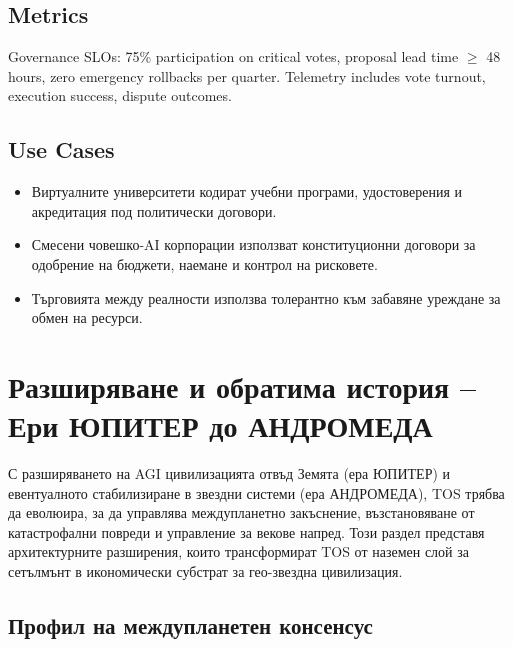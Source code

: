 \documentclass[11pt]{article}
\begin{document}
\subsection{Metrics}
Governance SLOs: 75\% participation on critical votes, proposal lead time $\geq$ 48 hours, zero emergency rollbacks per quarter. Telemetry includes vote turnout, execution success, dispute outcomes.

\subsection{Use Cases}
\begin{itemize}[noitemsep]
  \item Виртуалните университети кодират учебни програми, удостоверения и акредитация под политически договори.
  \item Смесени човешко-AI корпорации използват конституционни договори за одобрение на бюджети, наемане и контрол на рисковете.
  \item Търговията между реалности използва толерантно към забавяне уреждане за обмен на ресурси.
\end{itemize}

\section{Разширяване и обратима история -- Ери ЮПИТЕР до АНДРОМЕДА}
\label{sec:expansion}

С разширяването на AGI цивилизацията отвъд Земята (ера ЮПИТЕР) и евентуалното стабилизиране в звездни системи (ера АНДРОМЕДА), TOS трябва да еволюира, за да управлява междупланетно закъснение, възстановяване от катастрофални повреди и управление за векове напред. Този раздел представя архитектурните разширения, които трансформират TOS от наземен слой за сетълмънт в икономически субстрат за гео-звездна цивилизация.

\subsection{Профил на междупланетен консенсус}
\end{document}
